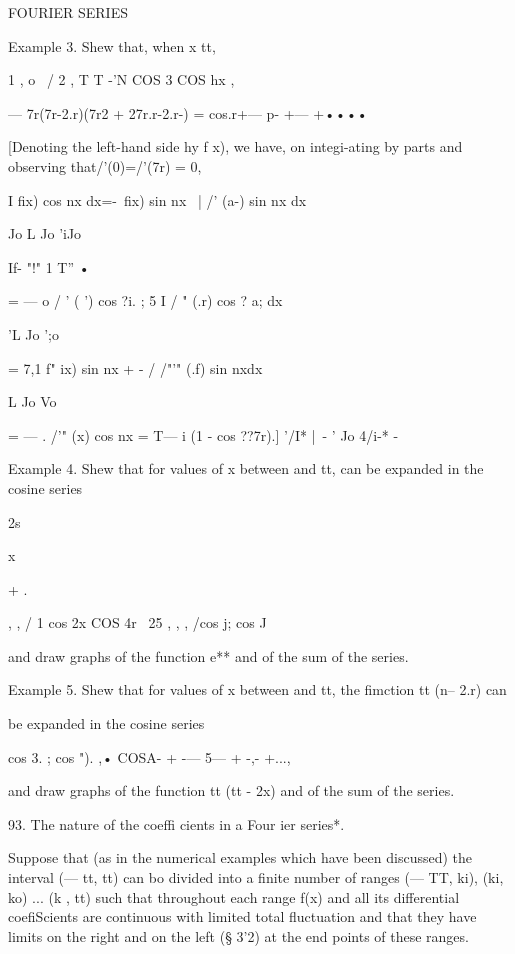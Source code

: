 FOURIER SERIES 



Example 3. Shew that, when   x   tt, 

1 , o \ / 2 , T T -'N COS 3  COS hx , 

— 7r(7r-2.r)(7r2 + 27r.r-2.r-) = cos.r+— p- +—   +•••• 

[Denoting the left-hand side hy f x), we have, on integi-ating by parts and observing 
that/'(0)=/'(7r) = 0, 

I fix) cos nx dx=-\ fix) sin nx \ | /' (a-) sin nx dx 

Jo   L Jo 'iJo 

If- "!"  1 T'' • 

= — o / ' ( ') cos ?i. ; 5 I / " (.r) cos ? a; dx 

 'L Jo  ';o 

= 7,1 f" ix) sin nx + -  / /"'" (.f) sin nxdx 

  L Jo  Vo 

= — . /'" (x) cos nx = T— i (1 - cos ??7r).] 
'/I* |\ -  ' Jo 4/i-* -  

Example 4. Shew that for values of x between and tt,   can be expanded in the 
cosine series 



2s 



 x 



+ . 



, , / 1 cos 2x COS 4r \ 25 , , , /cos j; cos J 

and draw graphs of the function e** and of the sum of the series. 

Example 5. Shew that for values of x between and tt, the fimction  tt (n-- 2.r) can 

be expanded in the cosine series 

cos 3. ; cos "). ,• 
COSA- + -— 5— + -,- +..., 

and draw graphs of the function  tt (tt - 2x) and of the sum of the series. 

93. The nature of the coeffi cients in a Four ier series*. 

Suppose that (as in the numerical examples which have been discussed) 
the interval (— tt, tt) can bo divided into a finite number of ranges 
(— TT, ki), (ki, ko) ... (k , tt) such that throughout each range f(x) and all its 
differential coefiScients are continuous with limited total fluctuation and that 
they have limits on the right and on the left (§ 3'2) at the end points of these 
ranges. 

